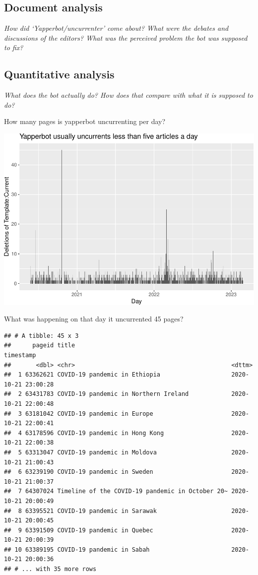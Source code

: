 \documentclass[Royal,times,sageh]{sagej}
\begin{document}
\hypertarget{document-analysis}{%
\subsection{Document analysis}\label{document-analysis}}

\emph{How did `Yapperbot/uncurrenter' come about? What were the debates
and discussions of the editors? What was the perceived problem the bot
was supposed to fix?}

\hypertarget{quantitative-analysis}{%
\subsection{Quantitative analysis}\label{quantitative-analysis}}

\emph{What does the bot actually do? How does that compare with what it
is supposed to do?}

How many pages is yapperbot uncurrenting per day?

\includegraphics[width=1\linewidth]{the-bot-that-makes-history_files/figure-latex/unnamed-chunk-3-1}

What was happening on that day it uncurrented 45 pages?

\begin{verbatim}
## # A tibble: 45 x 3
##      pageid title                                            timestamp          
##       <dbl> <chr>                                            <dttm>             
##  1 63362621 COVID-19 pandemic in Ethiopia                    2020-10-21 23:00:28
##  2 63431783 COVID-19 pandemic in Northern Ireland            2020-10-21 22:00:48
##  3 63181042 COVID-19 pandemic in Europe                      2020-10-21 22:00:41
##  4 63178596 COVID-19 pandemic in Hong Kong                   2020-10-21 22:00:38
##  5 63313047 COVID-19 pandemic in Moldova                     2020-10-21 21:00:43
##  6 63239190 COVID-19 pandemic in Sweden                      2020-10-21 21:00:37
##  7 64307024 Timeline of the COVID-19 pandemic in October 20~ 2020-10-21 20:00:49
##  8 63395521 COVID-19 pandemic in Sarawak                     2020-10-21 20:00:45
##  9 63391509 COVID-19 pandemic in Quebec                      2020-10-21 20:00:39
## 10 63389195 COVID-19 pandemic in Sabah                       2020-10-21 20:00:36
## # ... with 35 more rows
\end{verbatim}
\end{document}
